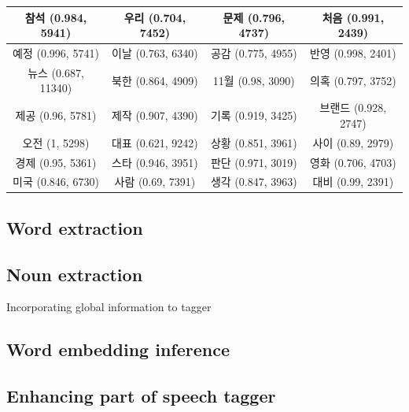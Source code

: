 \documentclass[11pt]{article}
\begin{document}
\begin{table}[H]
\begin{tabular}{|c|c|c|c|}
참석 (0.984, 5941) & 우리 (0.704, 7452) & 문제 (0.796, 4737) & 처음 (0.991, 2439) \\ \hline
예정 (0.996, 5741) & 이날 (0.763, 6340) & 공감 (0.775, 4955) & 반영 (0.998, 2401) \\ \hline
뉴스 (0.687, 11340) & 북한 (0.864, 4909) & 11월 (0.98, 3090) & 의혹 (0.797, 3752) \\ \hline
제공 (0.96, 5781) & 제작 (0.907, 4390) & 기록 (0.919, 3425) & 브랜드 (0.928, 2747) \\ \hline
오전 (1, 5298) & 대표 (0.621, 9242) & 상황 (0.851, 3961) & 사이 (0.89, 2979) \\ \hline
경제 (0.95, 5361) & 스타 (0.946, 3951) & 판단 (0.971, 3019) & 영화 (0.706, 4703) \\ \hline
미국 (0.846, 6730) & 사람 (0.69, 7391) & 생각 (0.847, 3963) & 대비 (0.99, 2391) \\ \hline
    \end{tabular}%
\end{table}












\subsection{Word extraction}


\vspace{3cm}

\subsection{Noun extraction}

Incorporating global information to tagger \citep{zhao2007incorporating} 

\vspace{3cm}


\subsection{Word embedding inference}

\vspace{3cm}

\subsection{Enhancing part of speech tagger}
\end{document}
